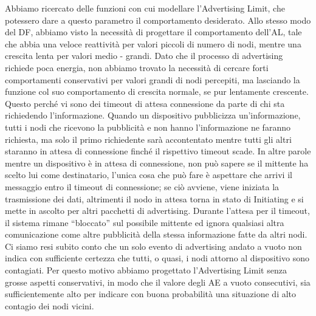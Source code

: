 Abbiamo ricercato delle funzioni con cui modellare l'Advertising Limit, che potessero dare a questo parametro il comportamento desiderato. Allo stesso modo del DF, abbiamo visto la necessità di progettare il comportamento dell'AL, tale che abbia una veloce reattività per valori piccoli di numero di nodi, mentre una crescita lenta per valori medio - grandi. Dato che il processo di advertising richiede poca energia, non abbiamo trovato la necessità di cercare forti comportamenti conservativi per valori grandi di nodi percepiti, ma lasciando la funzione col suo comportamento di crescita normale, se pur lentamente crescente. Questo perché vi sono dei timeout di attesa connessione da parte di chi sta richiedendo l'informazione. Quando un dispositivo pubblicizza un'informazione, tutti i nodi che ricevono la pubblicità e non hanno l'informazione ne faranno richiesta, ma solo il primo richiedente sarà accontentato mentre tutti gli altri staranno in attesa di connessione finché il rispettivo timeout scade. In altre parole mentre un dispositivo è in attesa di connessione, non può sapere se il mittente ha scelto lui come destinatario, l'unica cosa che può fare è aspettare che arrivi il messaggio entro il timeout di connessione; se ciò avviene, viene iniziata la trasmissione dei dati, altrimenti il nodo in attesa torna in stato di Initiating e si mette in ascolto per altri pacchetti di advertising. Durante l'attesa per il timeout, il sistema rimane “bloccato” sul possibile mittente ed ignora qualsiasi altra comunicazione come altre pubblicità della stessa informazione fatte da altri nodi. Ci siamo resi subito conto che un solo evento di advertising andato a vuoto non indica con sufficiente certezza che tutti, o quasi, i nodi attorno al dispositivo sono contagiati. Per questo motivo abbiamo progettato l'Advertising Limit senza grosse aspetti conservativi, in modo che il valore degli \acs{AE} a vuoto consecutivi, sia sufficientemente alto per indicare con buona probabilità una situazione di alto contagio dei nodi vicini.

